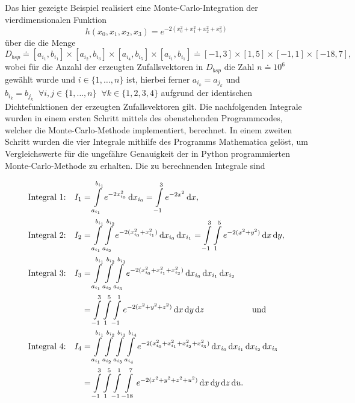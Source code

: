 \documentclass[a4paper,12pt]{article}
\begin{document}
Das hier gezeigte Beispiel realisiert eine Monte-Carlo-Integration der vierdimensionalen Funktion \begin{equation}\label{bespfunct}
h(x_0,x_1,x_2,x_3) = e^{-2(x_0^2 + x_1^2 + x_2^2 + x_3^2)}
\end{equation} über die die Menge \begin{equation}
D_{bsp} \doteq [a_{i_1},b_{i_1}] \times [a_{i_2},b_{i_3}] \times [a_{i_4},b_{i_5}] \times [a_{i_1},b_{i_1}] \doteq [-1,3] \times [1,5] \times [-1,1]\times [-18,7],
\end{equation} wobei für die Anzahl der erzeugten Zufallsvektoren in $D_{bsp}$ die Zahl $n \doteq 10^6$ gewählt wurde und $i \in \{1,\dots,n\}$ ist, hierbei ferner $a_{i_k} = a_{j_k}$ und $b_{i_k} = b_{j_k} \;\;\forall i,j \in \{1,\dots,n\} \;\; \forall k \in \{1,2,3,4\}$ aufgrund der identischen Dichtefunktionen der erzeugten Zufallsvektoren gilt. Die nachfolgenden Integrale wurden in einem ersten Schritt mittels des obenstehenden Programmcodes, welcher die Monte-Carlo-Methode implementiert, berechnet. In einem zweiten Schritt wurden die vier Integrale mithilfe des Programms Mathematica gelöst, um Vergleichswerte für die ungefähre Genauigkeit der in Python programmierten Monte-Carlo-Methode zu erhalten. Die zu berechnenden Integrale sind

\begin{align}\label{integralsbspcalc}
\text{Integral 1:}\quad I_1 &= \int\displaylimits_{a_{i_1}}^{b_{i_1}} e^{-2x_{i_0}^2} \,\mathrm{d}x_{i_0} = \int\displaylimits_{-1}^{3} e^{-2x^2} \,\mathrm{d}x, \\
\text{Integral 2:}\quad I_2 &= \int\displaylimits_{a_{i_1}}^{b_{i_1}} \int\displaylimits_{a_{i_2}}^{b_{i_2}}  e^{-2(x_{i_0}^2+x_{i_1}^2)} \,\mathrm{d}x_{i_0}\,\mathrm{d}x_{i_1} = \int\displaylimits_{-1}^{3} \int\displaylimits_{1}^{5}  e^{-2(x^2+y^2)} \,\mathrm{d}x\,\mathrm{d}y, \\
\text{Integral 3:}\quad I_3 &= \int\displaylimits_{a_{i_1}}^{b_{i_1}} \int\displaylimits_{a_{i_2}}^{b_{i_2}} \int\displaylimits_{a_{i_3}}^{b_{i_3}} e^{-2(x_{i_0}^2+x_{i_1}^2+x_{i_2}^2)} \,\mathrm{d}x_{i_0}\,\mathrm{d}x_{i_1} \,\mathrm{d}x_{i_2} \nonumber \\ &= \int\displaylimits_{-1}^{3} \int\displaylimits_{1}^{5} \int\displaylimits_{-1}^{1} e^{-2(x^2+y^2+z^2)} \,\mathrm{d}x\,\mathrm{d}y\,\mathrm{d}z \hspace{2cm} \text{und} \\
\text{Integral 4:}\quad I_4 &= \int\displaylimits_{a_{i_1}}^{b_{i_1}} \int\displaylimits_{a_{i_2}}^{b_{i_2}} \int\displaylimits_{a_{i_3}}^{b_{i_3}} \int\displaylimits_{a_{i_4}}^{b_{i_4}} e^{-2(x_{i_0}^2+x_{i_1}^2+x_{i_2}^2+x_{i_3}^2)} \,\mathrm{d}x_{i_0}\,\mathrm{d}x_{i_1} \,\mathrm{d}x_{i_2}\,\mathrm{d}x_{i_3} \nonumber \\ &= \int\displaylimits_{-1}^{3} \int\displaylimits_{1}^{5} \int\displaylimits_{-1}^{1} \int\displaylimits_{-18}^{7} e^{-2(x^2+y^2+z^2+u^2)} \,\mathrm{d}x\,\mathrm{d}y\,\mathrm{d}z\,\mathrm{d}u.
\end{align}
\end{document}
